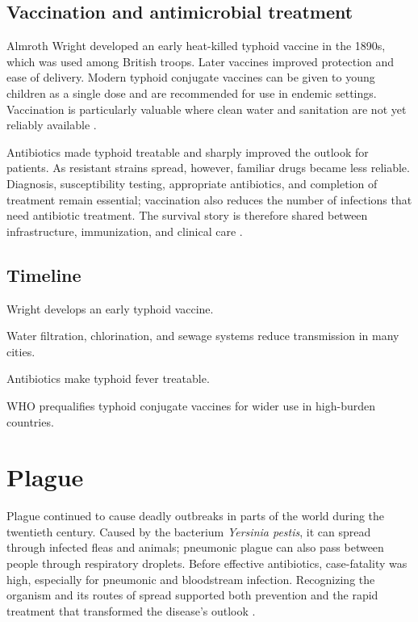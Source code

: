 \documentclass[12pt,oneside]{book}
\begin{document}
\section{Vaccination and antimicrobial treatment}
Almroth Wright developed an early heat-killed typhoid vaccine in the 1890s,
which was used among British troops. Later vaccines improved protection and
ease of delivery. Modern typhoid conjugate vaccines can be given to young
children as a single dose and are recommended for use in endemic settings.
Vaccination is particularly valuable where clean water and sanitation are
not yet reliably available \cite{whoTyphoid2023,wrightTyphoid1897}.

Antibiotics made typhoid treatable and sharply improved the outlook for
patients. As resistant strains spread, however, familiar drugs became less
reliable. Diagnosis, susceptibility testing, appropriate antibiotics, and
completion of treatment remain essential; vaccination also reduces the number
of infections that need antibiotic treatment. The survival story is therefore
shared between infrastructure, immunization, and clinical care
\cite{whoTyphoid2023}.

\section*{Timeline}
\begin{description}[leftmargin=2.3cm,style=nextline]
  \item[1896] Wright develops an early typhoid vaccine.
  \item[Late nineteenth and twentieth centuries] Water filtration, chlorination, and sewage systems reduce transmission in many cities.
  \item[Mid-twentieth century] Antibiotics make typhoid fever treatable.
  \item[2017 onward] WHO prequalifies typhoid conjugate vaccines for wider use in high-burden countries.
\end{description}

\chapter[Plague]{Plague}

Plague continued to cause deadly outbreaks in parts of the world during the
twentieth century. Caused by the bacterium \emph{Yersinia pestis}, it can
spread through infected fleas and animals; pneumonic plague can also pass
between people through respiratory droplets. Before effective antibiotics,
case-fatality was high, especially for pneumonic and bloodstream infection.
Recognizing the organism and its routes of spread supported both prevention
and the rapid treatment that transformed the disease's outlook
\cite{cdcPlagueEpidemiology,cdcPlagueGuidelines}.
\end{document}
